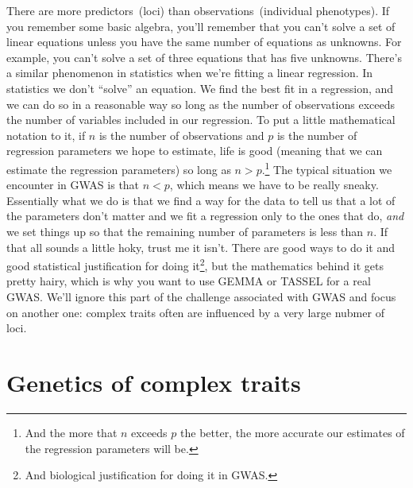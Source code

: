 There are more predictors~(loci) than observations~(individual
phenotypes). If you remember some basic algebra, you'll remember that
you can't solve a set of linear equations unless you have the same
number of equations as unknowns. For example, you can't solve a set of
three equations that has five unknowns. There's a similar phenomenon
in statistics when we're fitting a linear regression. In statistics we
don't ``solve'' an equation. We find the best fit in a regression, and
we can do so in a reasonable way so long as the number of observations
exceeds the number of variables included in our regression. To put a
little mathematical notation to it, if $n$ is the number of
observations and $p$ is the number of regression parameters we hope to
estimate, life is good (meaning that we can estimate the regression
parameters) so long as $n > p$.\footnote{And the more that $n$ exceeds
  $p$ the better, the more accurate our estimates of the regression
  parameters will be.} The typical situation we encounter in GWAS is
that $n < p$, which means we have to be really sneaky. Essentially
what we do is that we find a way for the data to tell us that a lot of
the parameters don't matter and we fit a regression only to the ones
that do, {\it and\/} we set things up so that the remaining number of
parameters is less than $n$. If that all sounds a little hoky, trust
me it isn't. There are good ways to do it and good statistical
justification for doing it\footnote{And biological justification for
  doing it in GWAS.}, but the mathematics behind it gets pretty hairy,
which is why you want to use GEMMA or TASSEL for a real GWAS. We'll
ignore this part of the challenge associated with GWAS and focus on
another one: complex traits often are influenced by a very large
nubmer of loci.

\section*{Genetics of complex traits}

